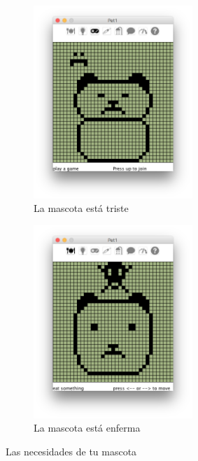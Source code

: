 \documentclass[12pt]{amsart}
\begin{document}
\begin{figure}
	\begin{subfigure}[b]{5cm}
	\centering
	\includegraphics[width=6cm]{images/Sad.jpg}
	\caption{La mascota est\'a triste}
	\label{sad}
	\end{subfigure}
	\begin{subfigure}[b]{5cm}
	\centering
	\includegraphics[width=6cm]{images/Sick.jpg}
	\caption{La mascota est\'a enferma}
	\label{sick}
	\end{subfigure}
	\caption{Las necesidades de tu mascota}
\end{figure}
\end{document}
